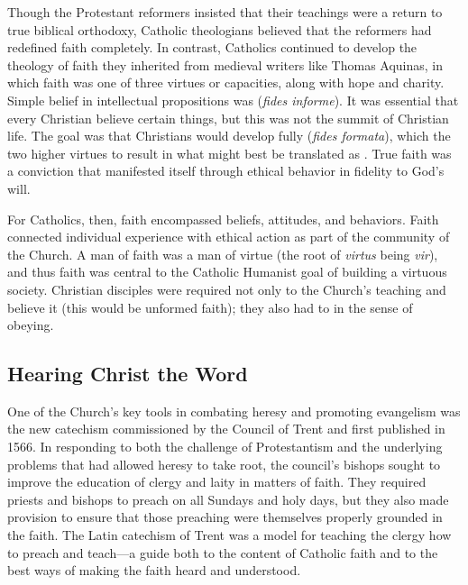Though the Protestant reformers insisted that their teachings were a return to
true biblical orthodoxy, Catholic theologians believed that the reformers had
redefined faith completely.
In contrast, Catholics continued to develop the theology of faith they inherited
from medieval writers like Thomas Aquinas, in which faith was one of three
virtues or capacities, along with hope and charity.%
\Autocite[130--132]{Schreiner:Certainty}
Simple belief in intellectual propositions was 
(\emph{fides informe}).%
    \Autocite[]{Catholic:Catechismus1614}
It was essential that every Christian believe certain things, but this was not
the summit of Christian life.
The goal was that Christians would develop fully 
(\emph{fides formata}), which  the two higher virtues to
result in  what might best be translated as .
True faith was a conviction that manifested itself through ethical behavior in
fidelity to God's will.

For Catholics, then, faith encompassed beliefs, attitudes, and behaviors.
Faith connected individual experience with ethical action as part of the
community of the Church.
A man of faith was a man of virtue (the root of \emph{virtus} being \emph{vir}),
and thus faith was central to the Catholic Humanist goal of building a virtuous
society.
Christian disciples were required not only to  the Church's
teaching and believe it (this would be unformed faith); they also had to
 in the sense of obeying.


\subsection{Hearing Christ the Word}

One of the Church's key tools in combating heresy and promoting evangelism was
the new catechism  commissioned by the Council of
Trent and first published in 1566.%
    \Autocites[]{Catholic:Catechismus1614}{NewCatholic}
In responding to both the challenge of Protestantism and the underlying problems
that had allowed heresy to take root, the council's bishops sought to improve
the education of clergy and laity in matters of faith.%
    \Autocite[]{NewCatholic}
They required priests and bishops to preach on all Sundays and holy days, but
they also made provision to ensure that those preaching were themselves properly
grounded in the faith.
The Latin catechism of Trent was a model for teaching the clergy how to preach
and teach---a guide both to the content of Catholic faith and to the best ways
of making the faith heard and understood.

